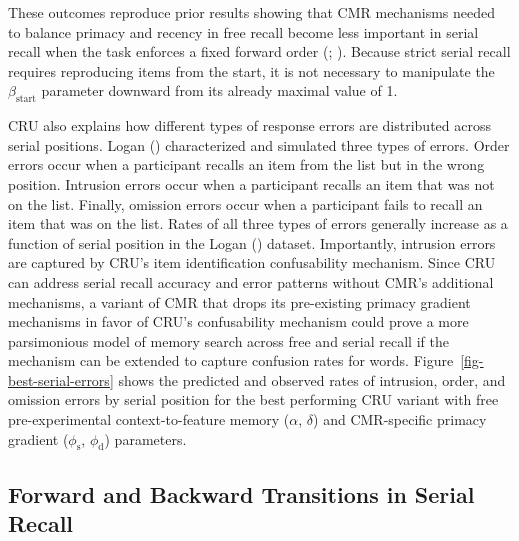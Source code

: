 \documentclass[
  man,
  floatsintext,
  longtable,
  nolmodern,
  notxfonts,
  notimes,
  draftfirst,
  colorlinks=true,linkcolor=blue,citecolor=blue,urlcolor=blue]{apa7}
\begin{document}
These outcomes reproduce prior results showing that CMR mechanisms
needed to balance primacy and recency in free recall become less
important in serial recall when the task enforces a fixed forward order
(;
). Because strict serial
recall requires reproducing items from the start, it is not necessary to
manipulate the \(\beta_\text{start}\) parameter downward from its
already maximal value of 1.

CRU also explains how different types of response errors are distributed
across serial positions. Logan ()
characterized and simulated three types of errors. Order errors occur
when a participant recalls an item from the list but in the wrong
position. Intrusion errors occur when a participant recalls an item that
was not on the list. Finally, omission errors occur when a participant
fails to recall an item that was on the list. Rates of all three types
of errors generally increase as a function of serial position in the
Logan () dataset. Importantly,
intrusion errors are captured by CRU's item identification confusability
mechanism. Since CRU can address serial recall accuracy and error
patterns without CMR's additional mechanisms, a variant of CMR that
drops its pre-existing primacy gradient mechanisms in favor of CRU's
confusability mechanism could prove a more parsimonious model of memory
search across free and serial recall if the mechanism can be extended to
capture confusion rates for words. Figure~\ref{fig-best-serial-errors}
shows the predicted and observed rates of intrusion, order, and omission
errors by serial position for the best performing CRU variant with free
pre-experimental context-to-feature memory (\(\alpha\), \(\delta\)) and
CMR-specific primacy gradient (\(\phi_\text{s}\), \(\phi_\text{d}\))
parameters.

\subsection{Forward and Backward Transitions in Serial
Recall}\label{forward-and-backward-transitions-in-serial-recall}
\end{document}
